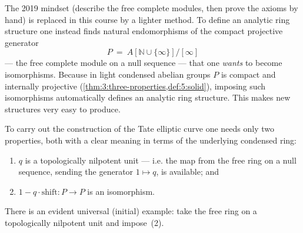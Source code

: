 \begin{center}
\end{center}

\begin{remark}
\label{rmk:12:mindset-endomorphisms}
The 2019 mindset (describe the free complete modules, then prove the axioms by
hand) is replaced in this course by a lighter method. To define an analytic ring
structure one instead finds natural endomorphisms of the compact projective
generator
\begin{equation*}
P\ =\ A[\mathbb{N}\cup\{\infty\}]\big/[\infty]
\end{equation*}
--- the free complete module on a null sequence --- that one \emph{wants} to
become isomorphisms. Because in light condensed abelian groups $P$ is compact and
internally projective (\cref{thm:3:three-properties,def:5:solid}), imposing such
isomorphisms automatically defines an analytic ring structure. This makes new
structures very easy to produce.
\end{remark}

\begin{remark}
\label{rmk:12:tate-needs-two}
To carry out the construction of the Tate elliptic curve one needs only two
properties, both with a clear meaning in terms of the underlying condensed ring:
\begin{enumerate}
\item $q$ is a topologically nilpotent unit --- i.e. the map from the free ring
on a null sequence, sending the generator $1\mapsto q$, is available; and
\item $1-q\cdot\mathrm{shift}\colon P\to P$ is an isomorphism.
\end{enumerate}
There is an evident universal (initial) example: take the free ring on a
topologically nilpotent unit and impose~(2).
\end{remark}


